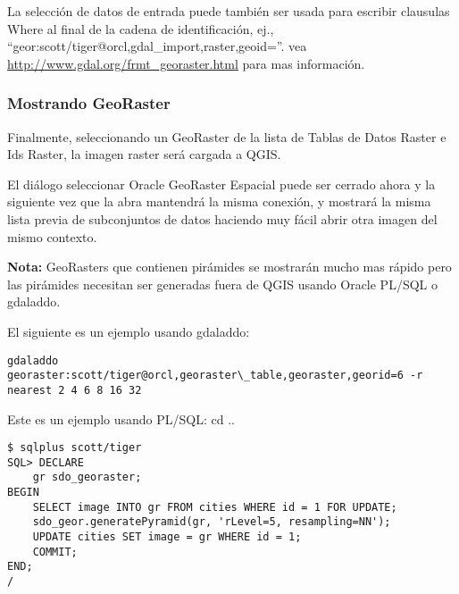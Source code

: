 La selección de datos de entrada puede también ser usada para escribir clausulas Where al final de la cadena de identificación, ej., 
``geor:scott/tiger@orcl,gdal\_import,raster,geoid=''. vea \url{http://www.gdal.org/frmt_georaster.html} para mas información.

\subsubsection{Mostrando GeoRaster}

Finalmente, seleccionando un GeoRaster de la lista de Tablas de Datos Raster e Ids Raster, la imagen raster será cargada a QGIS.

El diálogo seleccionar Oracle GeoRaster Espacial puede ser cerrado ahora y la siguiente vez que la abra mantendrá la misma conexión, y mostrará la misma lista previa de subconjuntos de datos haciendo muy fácil abrir otra imagen del mismo contexto.

\textbf{Nota:} GeoRasters que contienen pirámides se mostrarán mucho mas rápido pero las pirámides necesitan ser generadas fuera de QGIS usando Oracle PL/SQL o gdaladdo.

El siguiente es un ejemplo usando gdaladdo:

\begin{verbatim}
gdaladdo georaster:scott/tiger@orcl,georaster\_table,georaster,georid=6 -r 
nearest 2 4 6 8 16 32
\end{verbatim}

Este es un ejemplo usando PL/SQL: 
cd ..
\begin{verbatim}
$ sqlplus scott/tiger
SQL> DECLARE
    gr sdo_georaster;
BEGIN
    SELECT image INTO gr FROM cities WHERE id = 1 FOR UPDATE;
    sdo_geor.generatePyramid(gr, 'rLevel=5, resampling=NN');
    UPDATE cities SET image = gr WHERE id = 1;
    COMMIT;
END;
/
\end{verbatim}

